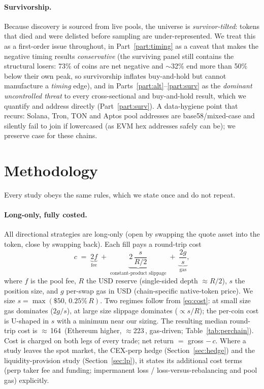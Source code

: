 \documentclass[12pt]{article}
\newcommand{\bp}{\,\text{bp}}
\begin{document}
\paragraph{Survivorship.} Because discovery is sourced from live pools, the universe is \emph{survivor-tilted}: tokens that died and were delisted before sampling are under-represented. We treat this as a first-order issue throughout, in Part~\ref{part:timing} as a caveat that makes the negative timing results \emph{conservative} (the surviving panel still contains the structural losers: 73\% of coins are net negative and $\sim$32\% end more than 50\% below their own peak, so survivorship inflates buy-and-hold but cannot manufacture a \emph{timing} edge), and in Parts~\ref{part:alt}--\ref{part:surv} as the \emph{dominant uncontrolled threat} to every cross-sectional and buy-and-hold result, which we quantify and address directly (Part~\ref{part:surv}). A data-hygiene point that recurs: Solana, Tron, TON and Aptos pool addresses are base58/mixed-case and silently fail to join if lowercased (as EVM hex addresses safely can be); we preserve case for these chains.

\section{Methodology}\label{sec:method}
Every study obeys the same rules, which we state once and do not repeat.

\paragraph{Long-only, fully costed.} All directional strategies are long-only (open by swapping the quote asset into the token, close by swapping back). Each fill pays a round-trip cost
\begin{equation}
c \;=\; \underbrace{2f}_{\text{fee}} \;+\; \underbrace{2\,\frac{s}{R/2}}_{\text{constant-product slippage}} \;+\; \underbrace{\frac{2g}{s}}_{\text{gas}},
\label{eq:cost}
\end{equation}
where $f$ is the pool fee, $R$ the USD reserve (single-sided depth $\approx R/2$), $s$ the position size, and $g$ per-swap gas in USD (chain-specific native-token price). We size $s=\max(\$50,\,0.25\%\,R)$. Two regimes follow from \eqref{eq:cost}: at small size gas dominates ($2g/s$), at large size slippage dominates ($\propto s/R$); the per-coin cost is U-shaped in $s$ with a minimum near our sizing. The resulting median round-trip cost is $\approx$\,164\bp{} (Ethereum higher, $\approx$223\bp, gas-driven; Table~\ref{tab:perchain}). Cost is charged on both legs of every trade; net return $=$ gross $-\,c$. Where a study leaves the spot market, the CEX-perp hedge (Section~\ref{sec:hedge}) and the liquidity-provision study (Section~\ref{sec:lp}), it states its additional cost terms (perp taker fee and funding; impermanent loss / loss-versus-rebalancing and pool gas) explicitly.
\end{document}
